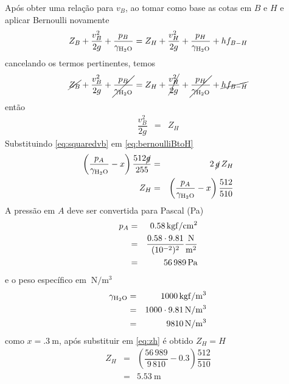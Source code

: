 \documentclass[a4paper, 12pt, brazilian]{article}
\begin{document}
	Após obter uma relação para $v_{B}$, ao tomar como base as cotas em $B$ e $H$ e aplicar Bernoulli novamente
	\begin{equation}
			Z_{B}+\dfrac{v_{B}^{2}}{2g}+\dfrac{p_{B}}{\gamma_{\ce{H2O}}}=Z_{H}+\dfrac{v_{H}^{2}}{2g}+\dfrac{p_{H}}{\gamma_{\ce{H2O}}}+hf_{B-H}
	\end{equation}
	cancelando os termos pertinentes, temos
	\begin{equation}
		\cancel{Z_{B}}+\dfrac{v_{B}^{2}}{2g}+\cancel{\dfrac{p_{B}}{\gamma_{\ce{H2O}}}}=Z_{H}+\cancel{\dfrac{v_{H}^{2}}{2g}}+\cancel{\dfrac{p_{H}}{\gamma_{\ce{H2O}}}}+\cancel{hf_{B-H}}
	\end{equation}
	então
	\begin{eqnarray}
		\label{eq:bernoulliBtoH}
		\dfrac{v_{B}^{2}}{2g}&=&Z_{H}
	\end{eqnarray}
	Substituindo \eqref{eq:squaredvb} em \eqref{eq:bernoulliBtoH}
	\begin{eqnarray}
		\left(\dfrac{p_{A}}{\gamma_{\ce{H2O}}}-x\right)\dfrac{512\cancel{g}}{255}&=&2\,\cancel{g}\,Z_{H}\\
		Z_{H}&=&\left(\dfrac{p_{A}}{\gamma_{\ce{H2O}}}-x\right)\dfrac{512}{510}\label{eq:zh}
	\end{eqnarray}
	A pressão em $A$ deve ser convertida para Pascal (Pa)
	\begin{eqnarray}
		p_{A}&=&\SI{.58}{\kilogram f/\centi\meter^{2}}\\
			 &=&\dfrac{0.58\cdot 9.81}{(10^{-2})^{2}}\SI{}{\dfrac{\newton}{\meter^{2}}}\\
			 &=&\SI{56989}{\pascal}
	\end{eqnarray}
	e o peso específico em $\SI{}{\newton/\meter^{3}}$
	\begin{eqnarray}
		\gamma_{\ce{H2O}}&=&\SI{1000}{\kilogram f/\meter^{3}}\\
						 &=&1000\cdot 9.81\,\SI{}{\newton/\meter^{3}}\\
						 &=&\SI{9810}{\newton/\meter^{3}}
	\end{eqnarray}
	como $x=\SI{.3}{\meter}$, após substituir em \eqref{eq:zh} é obtido $Z_{H}=H$
	\begin{eqnarray}
		Z_{H}&=&\left(\dfrac{56\,989}{9\,810}-0.3\right)\dfrac{512}{510}\\
			 &=&\SI{5.53}{\meter}
	\end{eqnarray}
\end{document}
